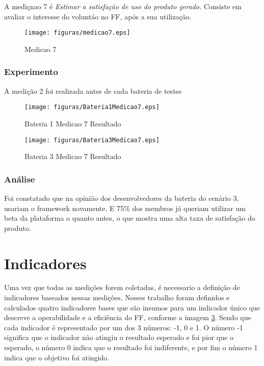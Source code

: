 A mediçnao 7 é \textit{Estimar a satisfação de uso do produto gerado.} Consiste em avaliar o interesse do voluntáo no FF, após
a sua utilização.

\begin{figure}[H]
  \centering
  \label{fig:indicadores}
  \texttt{[image: figuras/medicao7.eps]}
  \caption{Medicao 7}
\end{figure}

\subsubsection{Experimento}

A medição 2 foi realizada antes de cada bateria de testes


\begin{figure}[H]
  \centering
  \label{fig:indicadores}
  \texttt{[image: figuras/Bateria1Medicao7.eps]}
  \caption{Bateria 1 Medicao 7 Resultado}
\end{figure}


\begin{figure}[H]
  \centering
  \label{fig:indicadores}
  \texttt{[image: figuras/Bateria3Medicao7.eps]}
  \caption{Bateria 3 Medicao 7 Resultado}
\end{figure}



\subsubsection{Análise}

Foi constatado que na opinião dos desenvolvedores da bateria do cenário 3, usariam o framework novamente. E
75\% dos membros já queriam utilizar um beta da plataforma o quanto antes, o que mostra uma alta taxa de satisfação
do produto.

\section{Indicadores}\label{ss:indicadores}

Uma vez que todas as medições forem coletadas, é necessario a definição de indicadores baseados nessas medições.
Nesses trabalho foram definidos e calculados quatro indicadores bases que são insumos para um indicador único que descreve
a operabilidade e a eficiência do FF, conforme a imagem \ref{fig:indicadores}. Sendo que cada indicador é representado por
um dos 3 números: -1, 0 e 1. O número -1 significa que o indicador não atingiu o resultado esperado e foi pior que o esperado,
o número 0 indica que o resultado foi indiferente, e por fim o número 1 indica que o objetivo foi atingido.

